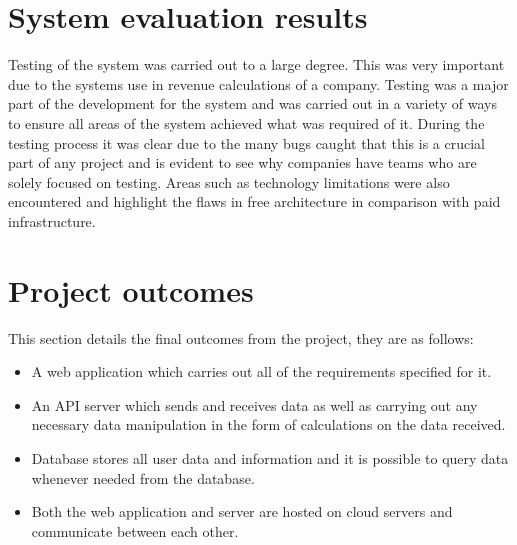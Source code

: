 \section{System evaluation results}
Testing of the system was carried out to a large degree. This was very important due to the systems use in revenue calculations of a company. Testing was a major part of the development for the system and was carried out in a variety of ways to ensure all areas of the system achieved what was required of it. During the testing process it was clear due to the many bugs caught that this is a crucial part of any project and is evident to see why companies have teams who are solely focused on testing. Areas such as technology limitations were also encountered and highlight the flaws in free architecture in comparison with paid infrastructure. 

\section{Project outcomes}
This section details the final outcomes from the project, they are as follows:
\begin{itemize}
    \item A web application which carries out all of the requirements specified for it.
    \item An API server which sends and receives data as well as carrying out any necessary data manipulation in the form of calculations on the data received.
    \item Database stores all user data and information and it is possible to query data whenever needed from the database.
    \item Both the web application and server are hosted on cloud servers and communicate between each other.
\end{itemize}

